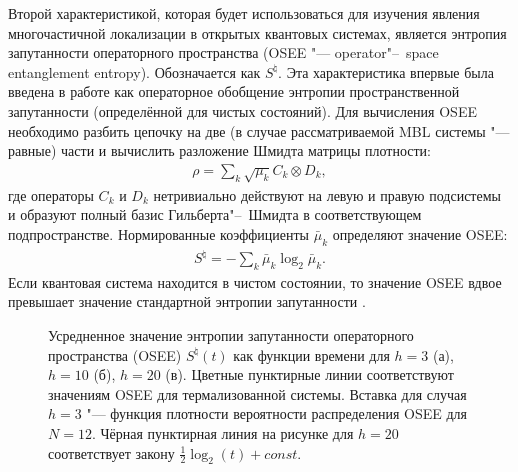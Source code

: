 Второй характеристикой, которая будет использоваться для изучения явления многочастичной локализации в открытых квантовых системах, является энтропия запутанности операторного пространства (OSEE "--- operator"--~space entanglement entropy). Обозначается как \(S^{\natural}\). 
Эта характеристика впервые была введена в работе \cite{Prosen2007} как операторное обобщение энтропии пространственной запутанности (определённой для чистых состояний).
Для вычисления OSEE необходимо разбить цепочку на две (в случае рассматриваемой MBL системы "--- равные) части и вычислить разложение Шмидта матрицы плотности:
\begin{equation}
\label{eq:mbl_osee_shcmidt}
\begin{gathered}
\rho = \sum_{k} \sqrt{\mu_k} C_k \otimes D_k, 
\end{gathered}
\end{equation}
где операторы \(C_k\) и \(D_k\) нетривиально действуют на левую и правую подсистемы и образуют полный базис Гильберта"--~Шмидта в соответствующем подпространстве.
Нормированные коэффициенты \(\bar{\mu}_k\) определяют значение OSEE:
\begin{equation}
\label{eq:mbl_osee}
\begin{gathered}
S^{\natural} = - \sum_{k} \bar{\mu}_k \log_2{\bar{\mu}_k}. 
\end{gathered}
\end{equation}
Если квантовая система находится в чистом состоянии, то значение OSEE вдвое превышает значение стандартной энтропии запутанности \cite{Znidaric2008_entropy}.

\begin{figure}[h]
	\legend{}
	\caption[Энтропия запутанности операторного пространства (OSEE)]
	{
		Усредненное значение энтропии запутанности операторного пространства (OSEE) \(S^{\natural}(t)\) как функции времени для \(h=3\) (а), \(h=10\) (б), \(h=20\) (в). Цветные пунктирные линии соответствуют значениям OSEE для термализованной системы. Вставка для случая \(h=3\) "--- функция плотности вероятности распределения OSEE для \(N=12\). Чёрная пунктирная линия на рисунке для \(h=20\) соответствует закону \(\frac{1}{2}\log_2(t) + const\).
	}
	\label{fig:mbl_osee_1}
\end{figure}


